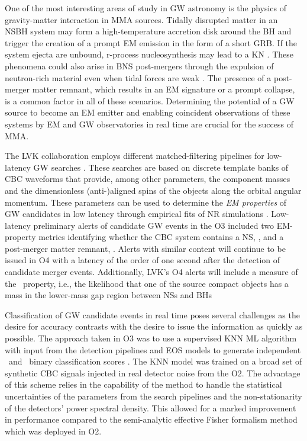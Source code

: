 One of the most interesting areas of study in \ac{GW} astronomy is the physics of gravity-matter interaction in \ac{MMA} sources. Tidally disrupted matter in an
\ac{NSBH} system may form a high-temperature accretion disk around the \ac{BH} and trigger the creation of a prompt \ac{EM} emission in the form of a short \ac{GRB}. If
the system ejecta are unbound, r-process nucleosynthesis may lead to a \ac{KN} \cite{Lattimer:1974slx, Li:1998bw, Korobkin:2012uy, Barnes:2013wka, Tanaka:2013ana,
Kasen:2014toa}. These phenomena could also arise in \ac{BNS} post-mergers through the expulsion of neutron-rich material even when tidal forces are weak
\cite{LIGOScientific:2017ync, Arcavi:2017xiz, Coulter:2017wya, Kasliwal:2017ngb, Lipunov:2017dwd, DES:2017kbs, Tanvir:2017pws}. The presence of a post-merger matter
remnant, which results in an \ac{EM} signature or a prompt collapse, is a common factor in all of these scenarios. Determining the potential of a \ac{GW} source to
become an \ac{EM} emitter and enabling coincident observations of these systems by \ac{EM} and \ac{GW} observatories in real time are crucial for the success of
\ac{MMA}.

The \ac{LVK} collaboration employs different matched-filtering pipelines for low-latency \ac{GW} searches \cite{Sachdev:2020lfd,Nitz_2018,Adams_2016} . These searches are based on discrete template banks of \ac{CBC} waveforms that provide, among other parameters, the component masses and the
dimensionless (anti-)aligned spins of the objects along the orbital angular momentum. These parameters can be used to determine the \emph{\ac{EM} properties} of
\ac{GW} candidates in low latency through empirical fits of \ac{NR} simulations \cite{Foucart:2012nc,Foucart:2018rjc}. Low-latency preliminary alerts of candidate
\ac{GW} events in the \ac{O3} included two \ac{EM}-property metrics identifying whether the \ac{CBC} system contains a \ac{NS}, \hasns, and a post-merger matter
remnant, \hasrem. Alerts with similar content will continue to be issued in \ac{O4} with a latency of the order of one second after the detection of candidate merger events.  Additionally, \ac{LVK}'s \ac{O4} alerts will include a measure of the \hasgap\ property, i.e., the likelihood that one of the source compact objects has a mass in the lower-mass gap region between \ac{NS}s and \ac{BH}s

Classification of \ac{GW} candidate events in real time poses several challenges as the desire for accuracy contrasts with the desire to issue the information as
quickly as possible. The approach taken in \ac{O3} was to use a supervised \ac{KNN} \cite{Pedregosa:2011ork} \ac{ML} algorithm with input from the detection pipelines
and \ac{EOS} models to generate independent \hasns\ and \hasrem\ binary classification scores \cite{Chatterjee:2019avs}. The \ac{KNN} model was trained on a broad set
of synthetic \ac{CBC} signals injected in real detector noise from the \ac{O2}. The advantage of this scheme relies in the capability of the method to handle the
statistical uncertainties of the parameters from the search pipelines and the non-stationarity of the detectors' power spectral density. This allowed for a marked
improvement in performance compared to the semi-analytic effective Fisher formalism method which was deployed in \ac{O2}.

